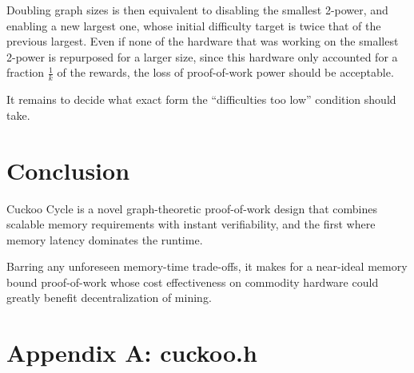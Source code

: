 \documentclass[11pt, oneside]{article}
\begin{document}
Doubling graph sizes is then equivalent to disabling the smallest 2-power,
and enabling a new largest one, whose initial difficulty target is twice that of the previous largest.
Even if none of the hardware that was working on the smallest 2-power is repurposed for a larger size,
since this hardware only accounted for a fraction $\frac{1}{k}$ of the rewards, the loss of
proof-of-work power should be acceptable.

It remains to decide what exact form the ``difficulties too low'' condition should take.

\section{Conclusion}
Cuckoo Cycle is a novel graph-theoretic proof-of-work design that combines
scalable memory requirements with instant verifiability,
and the first where memory latency dominates the runtime.

Barring any unforeseen memory-time trade-offs, it makes for a near-ideal memory bound proof-of-work
whose cost effectiveness on commodity hardware could greatly benefit decentralization of mining.




\lstset{language=C,basicstyle=\footnotesize}
\section{Appendix A: cuckoo.h}


%

%
\end{document}
